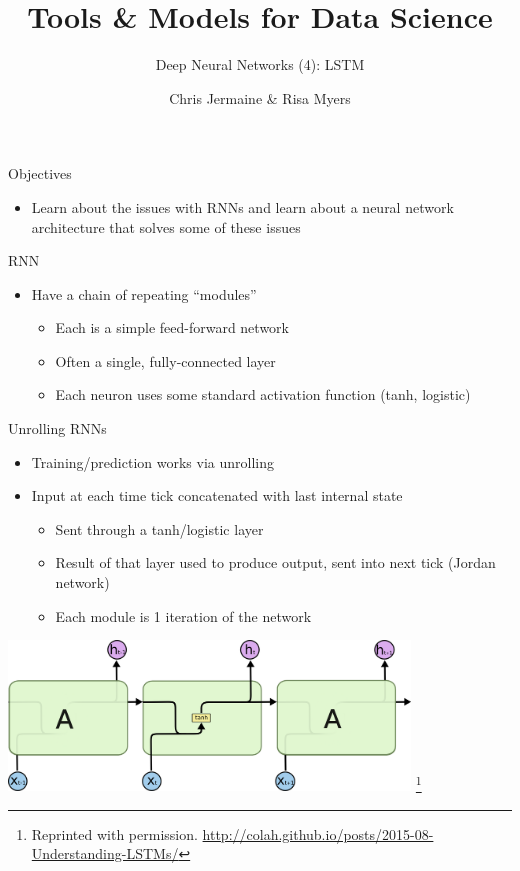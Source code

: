 \documentclass[aspectratio=169]{beamer}
\title[]
{Tools \& Models for Data Science}
\subtitle{Deep Neural Networks (4): LSTM}
\author[]{Chris Jermaine \& Risa Myers}
\institute
{
  Rice University 
}
\date[]{}
\begin{document}
\begin{frame}
 \titlepage
\end{frame}
\begin{frame}{Objectives}

\begin{itemize}
\item Learn about the issues with RNNs and learn about a neural network architecture that solves some of these issues
\end{itemize}
\end{frame}
\begin{frame}{RNN}

\begin{itemize}
	\item Have a chain of repeating ``modules'' 
	\begin{itemize}
	\item Each is a simple feed-forward network
	\item Often a single, fully-connected layer
	\item Each neuron uses some standard activation function (tanh, logistic)
	\end{itemize}
\end{itemize}
\end{frame}
\begin{frame}{Unrolling RNNs}

\begin{itemize}
	\item Training/prediction works via unrolling
	\item Input at each time tick concatenated with last internal state
\begin{itemize}
	\item Sent through a tanh/logistic layer
	\item Result of that layer used to produce output, sent into next tick (Jordan network)
	\item Each module is 1 iteration of the network
\end{itemize}
\end{itemize}
\includegraphics[width=0.8\textwidth]{lectLSTM/LSTM3-SimpleRNN.png}
\footnote{Reprinted with permission. \url{http://colah.github.io/posts/2015-08-Understanding-LSTMs/}}
\end{frame}
\end{document}
